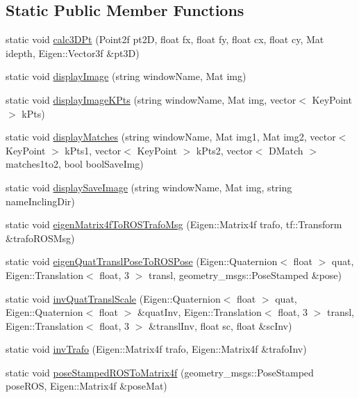 \subsection*{\-Static \-Public \-Member \-Functions}
\begin{DoxyCompactItemize}
\item 
static void \hyperlink{classHelperFcts_a78ecd5fc1beee4ac69e27e0a07258b50}{calc3\-D\-Pt} (\-Point2f pt2\-D, float fx, float fy, float cx, float cy, \-Mat idepth, \-Eigen\-::\-Vector3f \&pt3\-D)
\item 
static void \hyperlink{classHelperFcts_a3ebc81e09f781348d15f4f1898d7fb05}{display\-Image} (string window\-Name, \-Mat img)
\item 
static void \hyperlink{classHelperFcts_ac6ef7c94a83c9c7e79d83002528943de}{display\-Image\-K\-Pts} (string window\-Name, \-Mat img, vector$<$ \-Key\-Point $>$ k\-Pts)
\item 
static void \hyperlink{classHelperFcts_a604ec2c5d85568f3b51a08c268e9578c}{display\-Matches} (string window\-Name, \-Mat img1, \-Mat img2, vector$<$ \-Key\-Point $>$ k\-Pts1, vector$<$ \-Key\-Point $>$ k\-Pts2, vector$<$ \-D\-Match $>$ matches1to2, bool bool\-Save\-Img)
\item 
static void \hyperlink{classHelperFcts_a30131b3e45462ea3574240002efc9888}{display\-Save\-Image} (string window\-Name, \-Mat img, string name\-Incling\-Dir)
\item 
static void \hyperlink{classHelperFcts_aa8536f7744cd1ed6acba4fd7fe5fe8e8}{eigen\-Matrix4f\-To\-R\-O\-S\-Trafo\-Msg} (\-Eigen\-::\-Matrix4f trafo, tf\-::\-Transform \&trafo\-R\-O\-S\-Msg)
\item 
static void \hyperlink{classHelperFcts_ab7e012afc5fa512ff3f0961acac28f2e}{eigen\-Quat\-Transl\-Pose\-To\-R\-O\-S\-Pose} (\-Eigen\-::\-Quaternion$<$ float $>$ quat, \-Eigen\-::\-Translation$<$ float, 3 $>$ transl, geometry\-\_\-msgs\-::\-Pose\-Stamped \&pose)
\item 
static void \hyperlink{classHelperFcts_a987a1fd70323c857815e75b44dc432d9}{inv\-Quat\-Transl\-Scale} (\-Eigen\-::\-Quaternion$<$ float $>$ quat, \-Eigen\-::\-Quaternion$<$ float $>$ \&quat\-Inv, \-Eigen\-::\-Translation$<$ float, 3 $>$ transl, \-Eigen\-::\-Translation$<$ float, 3 $>$ \&transl\-Inv, float sc, float \&sc\-Inv)
\item 
static void \hyperlink{classHelperFcts_a92f54d3196a89e988323e73ebe14e106}{inv\-Trafo} (\-Eigen\-::\-Matrix4f trafo, \-Eigen\-::\-Matrix4f \&trafo\-Inv)
\item 
static void \hyperlink{classHelperFcts_ad8c1a028f297ea395c9d8239f64a74e2}{pose\-Stamped\-R\-O\-S\-To\-Matrix4f} (geometry\-\_\-msgs\-::\-Pose\-Stamped pose\-R\-O\-S, \-Eigen\-::\-Matrix4f \&pose\-Mat)

\end{DoxyCompactItemize}
